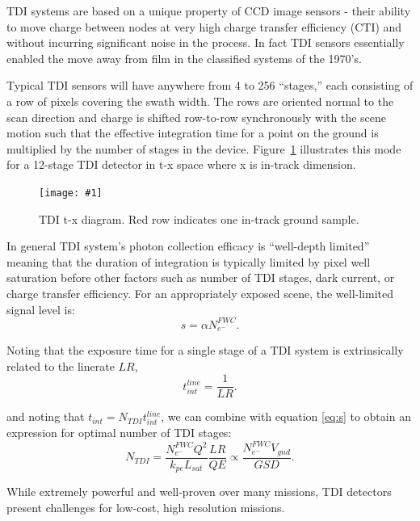 \documentclass[10pt,journal]{IEEEtran}  %
\newcommand{\includefigure}[3]
{
  \begin{figure}[h!]
  \centering
  \texttt{[image: \#1]}
  \caption[]{#3}
  \label{#2}
  \end{figure}
}
\begin{document}
TDI systems are based on a unique property of CCD image sensors - their ability to move charge between nodes at very high charge transfer efficiency (CTI) and without incurring significant noise in the process.  In fact TDI sensors essentially enabled the move away from film in the classified systems of the 1970's.

Typical TDI sensors will have anywhere from 4 to 256 ``stages,'' each consisting of a row of pixels covering the swath width.  The rows are oriented normal to the scan direction and charge is shifted row-to-row synchronously with the scene motion such that the effective integration time for a point on the ground is multiplied by the number of stages in the device.  Figure~\ref{fig:tdi} illustrates this mode for a 12-stage TDI detector in t-x space where x is in-track dimension.

\includefigure{figures/tdi.pgf}{fig:tdi}{TDI t-x diagram.  Red row indicates one in-track ground sample.}

In general TDI system's photon collection efficacy is ``well-depth limited'' meaning that the duration of integration is typically limited by pixel well saturation before other factors such as number of TDI stages, dark current, or charge transfer efficiency.  For an appropriately exposed scene, the well-limited signal level is:
\begin{equation}
s = \alpha N_{e^-}^{FWC}
\label{eq:well_limited}.
\end{equation}

Noting that the exposure time for a single stage of a TDI system is extrinsically related to the linerate $LR$,
\begin{equation}
t_{int}^{line} = \frac{1}{LR}
\label{eq:lr_tint}.
\end{equation}

and noting that $t_{int} = N_{TDI}t_{int}^{line}$, we can combine with equation \eqref{eq:s} to obtain an expression for optimal number of TDI stages:
\begin{equation}
N_{TDI} =\frac{N_{e^-}^{FWC} Q^2}{k_{pe} L_{sat}}\frac{LR}{QE} \propto \frac{N_{e^-}^{FWC}V_{gnd}}{GSD}
\label{eq:n_tdi}.
\end{equation}


While extremely powerful and well-proven over many missions, TDI detectors present challenges for low-cost, high resolution missions.
\end{document}
